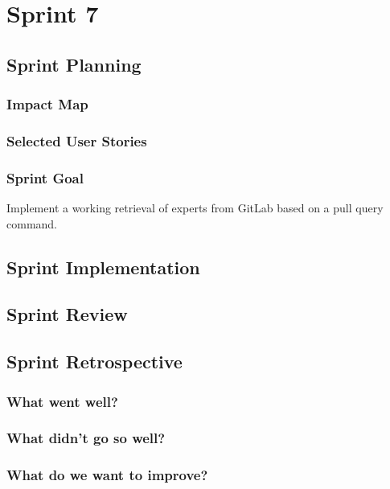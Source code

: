 \section{Sprint 7}

\subsection{Sprint Planning}

\subsubsection{Impact Map}

\begin{figure}[h!]
	
\end{figure}

\subsubsection{Selected User Stories}

\subsubsection{Sprint Goal}

Implement a working retrieval of experts from GitLab based on a pull query command.

\subsection{Sprint Implementation}

\subsection{Sprint Review}

\subsection{Sprint Retrospective}

\subsubsection{What went well?}

\subsubsection{What didn't go so well?}

\subsubsection{What do we want to improve?}